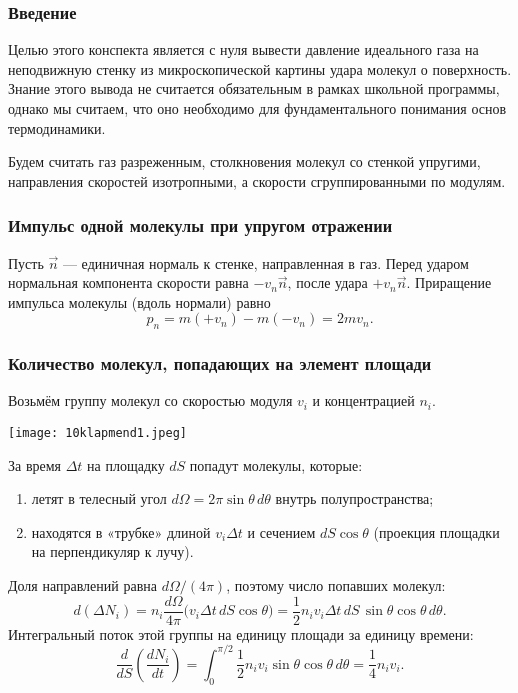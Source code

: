 \documentclass[12pt, a4paper]{article}%
\begin{document}
\subsubsection*{Введение}
Целью этого конспекта является с нуля вывести давление идеального газа на неподвижную стенку из микроскопической картины удара молекул о поверхность. Знание этого вывода не считается обязательным в рамках школьной программы, однако мы считаем, что оно необходимо для фундаментального понимания основ термодинамики.

Будем считать газ разреженным, столкновения молекул со стенкой упругими, направления скоростей изотропными, а скорости сгруппированными по модулям.

\subsubsection*{Импульс одной молекулы при упругом отражении}
Пусть \(\vec n\) — единичная нормаль к стенке, направленная в газ. Перед ударом нормальная компонента скорости равна \(-v_n \vec n\), после удара \(+v_n \vec n\). Приращение импульса молекулы (вдоль нормали) равно
\[
p_n = m(+v_n) - m(-v_n) = 2 m v_n.
\]

\subsubsection*{Количество молекул, попадающих на элемент площади}
Возьмём группу молекул со скоростью модуля \(v_i\) и концентрацией \(n_i\).

\begin{center}
\texttt{[image: 10klapmend1.jpeg]}
\label{fig:mpr}
\end{center}

За время \(\Delta t\) на площадку \(dS\) попадут молекулы, которые:

\begin{enumerate}
	\item летят в телесный угол \(d\Omega = 2\pi \sin\theta\, d\theta\) внутрь полупространства;
	\item находятся в «трубке» длиной \(v_i \Delta t\) и сечением \(dS \cos\theta\) (проекция площадки на перпендикуляр к лучу).
\end{enumerate}
Доля направлений равна \(d\Omega/(4\pi)\), поэтому число попавших молекул:
\[
d(\Delta N_i) = n_i \frac{d\Omega}{4\pi} \bigl(v_i \Delta t\, dS \cos\theta\bigr)
= \frac12 n_i v_i \Delta t\, dS\, \sin\theta \cos\theta\, d\theta.
\]
Интегральный поток этой группы на единицу площади за единицу времени:
\[
\frac{d}{dS}\left(\frac{dN_i}{dt}\right) = \int_{0}^{\pi/2} \frac12 n_i v_i \sin\theta \cos\theta\, d\theta
= \frac14 n_i v_i.
\]
\end{document}
